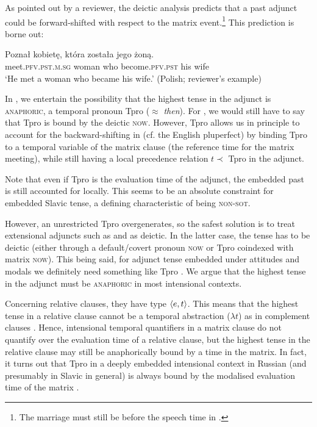 \documentclass[output=paper,colorlinks,citecolor=brown]{langscibook}
\begin{document}
As pointed out by a reviewer, the deictic analysis predicts that a past adjunct could be forward-shifted with respect to the  matrix event.\footnote{The marriage must still be before the speech time in .} This prediction is borne out:

\ea\label{rev-pol}\gll
Poznał kobietę, która została jego żoną.\\
meet.\textsc{pfv}.\textsc{pst.m.sg} woman who become.\textsc{pfv}.\textsc{pst} his wife\\
\glt `He met a woman who became his wife.'
\hfill (Polish; reviewer's example)
\z

\noindent In \citet{gronn_stechow2012}, we entertain the possibility that the highest tense in the adjunct is \textsc{anaphoric}, a temporal pronoun Tpro ($\approx$ \textit{then}). For , we would still have to say that Tpro is bound by the deictic \textsc{now}.
However, Tpro allows us in principle to account for the backward-shifting in  (cf. the English pluperfect) by binding Tpro to a temporal variable of the matrix clause (the reference time for the matrix meeting), while still having a local precedence relation $t \prec$ Tpro in the adjunct.

Note that even if Tpro  is the evaluation time of the adjunct, the embedded past is still accounted for locally. This seems to be an absolute constraint for embedded Slavic tense, a defining characteristic of being \textsc{non-sot}.

However, an unrestricted Tpro overgenerates, so the safest solution is to treat extensional adjuncts such as
 and 
as deictic. In the latter case, the tense has to be deictic (either through a default/covert pronoun \textsc{now} or Tpro coindexed with matrix \textsc{now}). This being said, 
for adjunct tense embedded   under attitudes and modals we definitely need something like Tpro \citep{gronn_stechow2012}.  We argue that the highest tense in the adjunct must be  \textsc{anaphoric} in most intensional contexts.  

Concerning relative clauses, they have type $\langle{e,t}\rangle$. This means that the highest tense in a relative clause cannot be a temporal abstraction ($\lambda t$) as in complement clauses \citep{kusumoto99}. Hence,  intensional temporal quantifiers in a matrix clause do not quantify over the evaluation time of a relative clause, but the highest tense in the relative clause may still be anaphorically bound by a time in the matrix.
In fact, it turns out that Tpro in a deeply embedded intensional context in Russian (and presumably in Slavic in general) is always bound by the modalised evaluation time of the matrix \citep{gronn24}.
\end{document}
